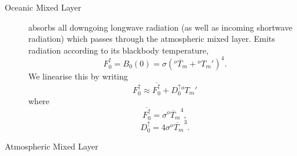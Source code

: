\documentclass[11pt, a4paper,twoside]{article}
\newcommand{\T}[2]{{{}^{#1}T_{#2}}}
\newcommand{\dup}[1]{D^{\uparrow}_{#1}}
\newcommand{\Fup}[1]{{F^{\uparrow}_{#1}}}
\newcommand{\B}[1]{{B_{#1}}}
\numberwithin{equation}{section}
\begin{document}
\begin{description}

\item[Oceanic Mixed Layer] absorbs all downgoing longwave radiation (as well as incoming shortwave radiation) which passes through the atmospheric mixed layer.
Emits radiation according to its blackbody temperature,
\begin{equation}
\Fup{0} = \B{0}(0) = \sigma \left(\overline{\T{o}{m}} + \T{o}{m}'\right)^4.
\end{equation}
We linearise this by writing
\begin{equation}
\Fup{0} \approx \overline{\Fup{0}} + \dup{0}\T{o}{m}'
\end{equation}
where
\begin{equation}
\overline{\Fup{0}} = \sigma \overline{\T{o}{m}}^4,
\end{equation}
\begin{equation}
\dup{0} = 4\sigma \overline{\T{o}{m}}^3.
\end{equation}

\item[Atmospheric Mixed Layer]


\end{description}
\end{document}
